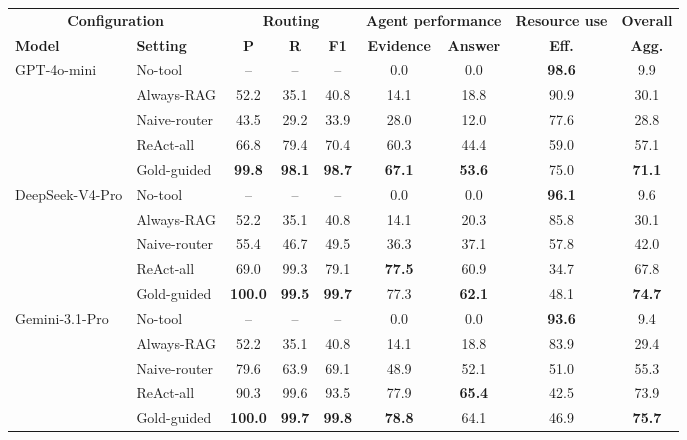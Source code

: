 \documentclass[11pt]{article}
\newcommand{\gcell}[1]{\cellcolor{guidanceblue}#1}
\begin{document}
\begin{table}[t]
\centering\small
\renewcommand{\arraystretch}{1.08}
\setlength{\tabcolsep}{4.2pt}
\begin{tabular*}{\textwidth}{@{\extracolsep{\fill}}llccccccc}
\toprule
\multicolumn{2}{c}{\textbf{Configuration}} & \multicolumn{3}{c}{\textbf{Routing}} & \multicolumn{2}{c}{\textbf{Agent performance}} & \textbf{Resource use} & \textbf{Overall} \\
\cmidrule(lr){3-5}\cmidrule(lr){6-7}
\textbf{Model} & \textbf{Setting} & \textbf{P} & \textbf{R} & \textbf{F1} & \textbf{Evidence} & \textbf{Answer} & \textbf{Eff.} & \textbf{Agg.} \\
\midrule
\multirow{5}{*}{GPT-4o-mini} & No-tool & -- & -- & -- & 0.0 & 0.0 & \textbf{98.6} & 9.9 \\
 & Always-RAG & 52.2 & 35.1 & 40.8 & 14.1 & 18.8 & 90.9 & 30.1 \\
 & Naive-router & 43.5 & 29.2 & 33.9 & 28.0 & 12.0 & 77.6 & 28.8 \\
 & ReAct-all & 66.8 & 79.4 & 70.4 & 60.3 & 44.4 & 59.0 & 57.1 \\
 & \gcell{Gold-guided} & \gcell{\textbf{99.8}} & \gcell{\textbf{98.1}} & \gcell{\textbf{98.7}} & \gcell{\textbf{67.1}} & \gcell{\textbf{53.6}} & \gcell{75.0} & \gcell{\textbf{71.1}} \\
\midrule
\multirow{5}{*}{DeepSeek-V4-Pro} & No-tool & -- & -- & -- & 0.0 & 0.0 & \textbf{96.1} & 9.6 \\
 & Always-RAG & 52.2 & 35.1 & 40.8 & 14.1 & 20.3 & 85.8 & 30.1 \\
 & Naive-router & 55.4 & 46.7 & 49.5 & 36.3 & 37.1 & 57.8 & 42.0 \\
 & ReAct-all & 69.0 & 99.3 & 79.1 & \textbf{77.5} & 60.9 & 34.7 & 67.8 \\
 & \gcell{Gold-guided} & \gcell{\textbf{100.0}} & \gcell{\textbf{99.5}} & \gcell{\textbf{99.7}} & \gcell{77.3} & \gcell{\textbf{62.1}} & \gcell{48.1} & \gcell{\textbf{74.7}} \\
\midrule
\multirow{5}{*}{Gemini-3.1-Pro} & No-tool & -- & -- & -- & 0.0 & 0.0 & \textbf{93.6} & 9.4 \\
 & Always-RAG & 52.2 & 35.1 & 40.8 & 14.1 & 18.8 & 83.9 & 29.4 \\
 & Naive-router & 79.6 & 63.9 & 69.1 & 48.9 & 52.1 & 51.0 & 55.3 \\
 & ReAct-all & 90.3 & 99.6 & 93.5 & 77.9 & \textbf{65.4} & 42.5 & 73.9 \\
 & \gcell{Gold-guided} & \gcell{\textbf{100.0}} & \gcell{\textbf{99.7}} & \gcell{\textbf{99.8}} & \gcell{\textbf{78.8}} & \gcell{64.1} & \gcell{46.9} & \gcell{\textbf{75.7}} \\

\end{tabular*}
\end{table}
\end{document}
